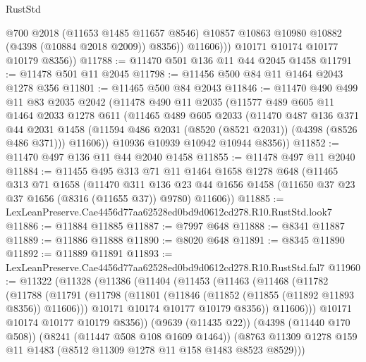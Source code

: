 \begin{lexlean}{RustStd}
\begin{coremodule}
                  @700
                  @2018
                  (@11653 @1485 @11657 @8546)
                  @10857
                  @10863
                  @10980
                  @10882
                  (@4398 (@10884 @2018 @2009))
                  @8356))
              @11606)))
        @10171
        @10174
        @10177
        @10179
        @8356))
@11788 := @11470 @501 @136 @11 @44 @2045 @1458
@11791 := @11478 @501 @11 @2045
@11798 := @11456 @500 @84 @11 @1464 @2043 @1278 @356
@11801 := @11465 @500 @84 @2043
@11846 := @11470
    @490
    @499
    @11
    @83
    @2035
    @2042
    (@11478
      @490
      @11
      @2035
      (@11577
        @489
        @605
        @11
        @1464
        @2033
        @1278
        @611
        (@11465
          @489
          @605
          @2033
          (@11470
            @487
            @136
            @371
            @44
            @2031
            @1458
            (@11594 @486 @2031 (@8520 (@8521 @2031)) (@4398 (@8526 @486 @371)))
            @11606))
        @10936
        @10939
        @10942
        @10944
        @8356))
@11852 := @11470 @497 @136 @11 @44 @2040 @1458
@11855 := @11478 @497 @11 @2040
@11884 := @11455
    @495
    @313
    @71
    @11
    @1464
    @1658
    @1278
    @648
    (@11465
      @313
      @71
      @1658
      (@11470
        @311
        @136
        @23
        @44
        @1656
        @1458
        (@11650 @37 @23 @37 @1656 (@8316 (@11655 @37)) @9780)
        @11606))
@11885 := LexLeanPreserve.Cae4456d77aa62528ed0bd9d0612cd278.R10.RustStd.look7
@11886 := @11884 @11885
@11887 := @7997 @648
@11888 := @8341 @11887
@11889 := @11886 @11888
@11890 := @8020 @648
@11891 := @8345 @11890
@11892 := @11889 @11891
@11893 := LexLeanPreserve.Cae4456d77aa62528ed0bd9d0612cd278.R10.RustStd.fal7
@11960 := @11322
    (@11328
      (@11386
        (@11404
          (@11453
            (@11463
              (@11468
                (@11782
                  (@11788
                    (@11791
                      (@11798
                        (@11801 (@11846 (@11852 (@11855 (@11892 @11893 @8356)) @11606)))
                        @10171
                        @10174
                        @10177
                        @10179
                        @8356))
                    @11606)))
              @10171
              @10174
              @10177
              @10179
              @8356))
          (@9639 (@11435 @22))
          (@4398 (@11440 @170 @508))
          (@8241 (@11447 @508 @108 @1609 @1464))
          (@8763 @11309 @1278 @159 @11 @1483 (@8512 @11309 @1278 @11 @158 @1483 @8523 @8529)))

\end{coremodule}
\end{lexlean}
